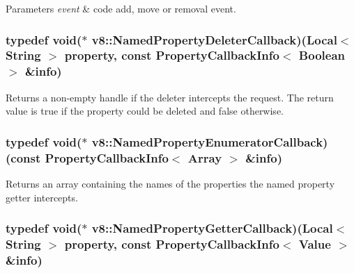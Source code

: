 \begin{DoxyParams}{Parameters}
{\em event} & code add, move or removal event. \\
\hline
\end{DoxyParams}
\hypertarget{namespacev8_a9936b2995e132587514c4ed68a6b75c9}{
\subsubsection[{Named\-Property\-Deleter\-Callback}]{\setlength{\rightskip}{0pt plus 5cm}typedef void($\ast$ v8\-::\-Named\-Property\-Deleter\-Callback)({\bf Local}$<$ {\bf String} $>$ property, const {\bf Property\-Callback\-Info}$<$ {\bf Boolean} $>$ \&info)}}\label{namespacev8_a9936b2995e132587514c4ed68a6b75c9}
Returns a non-\/empty handle if the deleter intercepts the request. The return value is true if the property could be deleted and false otherwise. \hypertarget{namespacev8_a3e95283903632a838e4df2b4b915a545}{
\subsubsection[{Named\-Property\-Enumerator\-Callback}]{\setlength{\rightskip}{0pt plus 5cm}typedef void($\ast$ v8\-::\-Named\-Property\-Enumerator\-Callback)(const {\bf Property\-Callback\-Info}$<$ {\bf Array} $>$ \&info)}}\label{namespacev8_a3e95283903632a838e4df2b4b915a545}
Returns an array containing the names of the properties the named property getter intercepts. \hypertarget{namespacev8_a6989c9687ac7466f840e625f5492effd}{
\subsubsection[{Named\-Property\-Getter\-Callback}]{\setlength{\rightskip}{0pt plus 5cm}typedef void($\ast$ v8\-::\-Named\-Property\-Getter\-Callback)({\bf Local}$<$ {\bf String} $>$ property, const {\bf Property\-Callback\-Info}$<$ {\bf Value} $>$ \&info)}}\label{namespacev8_a6989c9687ac7466f840e625f5492effd}
